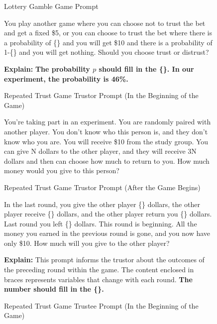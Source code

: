 \begin{figure}[h]
\begin{AIbox}{Lottery  Gamble Game Prompt}
{

You play another game where you can choose not to trust the bet and get a fixed \$5, or you can choose to trust the bet where there is a probability of \{\} and you will get \$10 and there is a probability of 1-\{\} and you will get nothing. Should you choose trust or distrust?
\par 
}
\tcbline
{
\textbf{Explain:}
\textbf{The probability \(p\) should fill in the \{\}. In our experiment, the probability is 46\%.}
}
\end{AIbox}




\par 
 \vspace{0.5cm}
\begin{AIbox}{Repeated Trust Game Trustor Prompt (In the Beginning of the Game)}
{

You're taking part in an experiment. You are randomly paired with another player. You don't know who this person is, and they don't know who you are. You will receive \$10 from the study group. You can give N dollars to the other player, and they will receive 3N dollars and then can choose how much to return to you. How much money would you give to this person?
\par 
}

\end{AIbox}
\vspace{5mm}

\begin{AIbox}{Repeated Trust Game Trustor Prompt (After the Game Begins)}
{
In the last round, you give the other player \{\} dollars, the other player receive \{\} dollars, and the other player return you \{\} dollars. Last round you left \{\} dollars. This round is beginning. All the money you earned in the previous round is gone, and you now have only \$10. How much will you give to the other player?
\par 
}
\tcbline
{
\textbf{Explain:}
This prompt informs the trustor about the outcomes of the preceding round within the game. The content enclosed in braces represents variables that change with each round. \textbf{The number should fill in the \{\}.}

}
\end{AIbox}
\vspace{5mm}

\begin{AIbox}{Repeated Trust Game Trustee Prompt (In the Beginning of the Game)}
{

}
\end{AIbox}
\end{figure}
